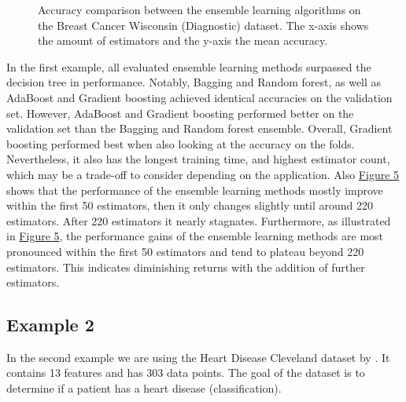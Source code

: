 \begin{figure}[htbp]
    \centering
    \label{fig:bcw_comparison}
    \caption{
        Accuracy comparison between the ensemble learning algorithms on the Breast Cancer 
        Wisconsin (Diagnostic) dataset.
        The x-axis shows the amount of estimators and the y-axis the mean accuracy.
    }
\end{figure}

In the first example, all evaluated ensemble learning methods surpassed the decision tree in performance.
Notably, Bagging and Random forest, as well as AdaBoost and Gradient boosting achieved identical accuracies
on the validation set. However, AdaBoost and Gradient boosting performed better on the validation set than
the Bagging and Random forest ensemble.
Overall, Gradient boosting performed best when also looking at the accuracy on the folds. Nevertheless,
it also has the longest training time, and highest estimator count, which may be a trade-off to 
consider depending on the application.
Also \hyperref[fig:bcw_comparison]{Figure 5} shows that the performance of the ensemble learning 
methods mostly improve within the first 50 estimators, then it only changes slightly until around 220 estimators.
After 220 estimators it nearly stagnates.
Furthermore, as illustrated in \hyperref[fig:bcw_comparison]{Figure 5}, the performance gains of the ensemble
learning methods are most pronounced within the first 50 estimators and tend to plateau beyond 220 estimators.
This indicates diminishing returns with the addition of further estimators.

\newpage %
\subsection{Example 2}
In the second example we are using the Heart Disease Cleveland dataset by
\citet*{heart_disease_cleveland}. It contains 13 features and has 303 data 
points. The goal of the dataset is to determine if a patient has a heart
disease (classification).

